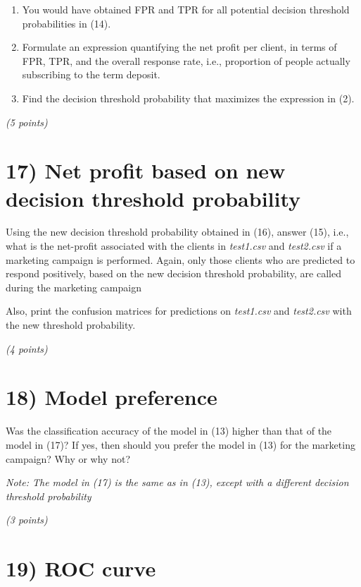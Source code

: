\documentclass[
  letterpaper,
  DIV=11,
  numbers=noendperiod]{scrreprt}
\begin{document}
\begin{enumerate}
\def\labelenumi{\arabic{enumi}.}
\item
  You would have obtained FPR and TPR for all potential decision
  threshold probabilities in (14).
\item
  Formulate an expression quantifying the net profit per client, in
  terms of FPR, TPR, and the overall response rate, i.e., proportion of
  people actually subscribing to the term deposit.
\item
  Find the decision threshold probability that maximizes the expression
  in (2).
\end{enumerate}

\emph{(5 points)}

\section{17) Net profit based on new decision threshold
probability}\label{net-profit-based-on-new-decision-threshold-probability}

Using the new decision threshold probability obtained in (16), answer
(15), i.e., what is the net-profit associated with the clients in
\emph{test1.csv} and \emph{test2.csv} if a marketing campaign is
performed. Again, only those clients who are predicted to respond
positively, based on the new decision threshold probability, are called
during the marketing campaign

Also, print the confusion matrices for predictions on \emph{test1.csv}
and \emph{test2.csv} with the new threshold probability.

\emph{(4 points)}

\section{18) Model preference}\label{model-preference}

Was the classification accuracy of the model in (13) higher than that of
the model in (17)? If yes, then should you prefer the model in (13) for
the marketing campaign? Why or why not?

\emph{Note: The model in (17) is the same as in (13), except with a
different decision threshold probability}

\emph{(3 points)}

\section{19) ROC curve}\label{roc-curve}
\end{document}
